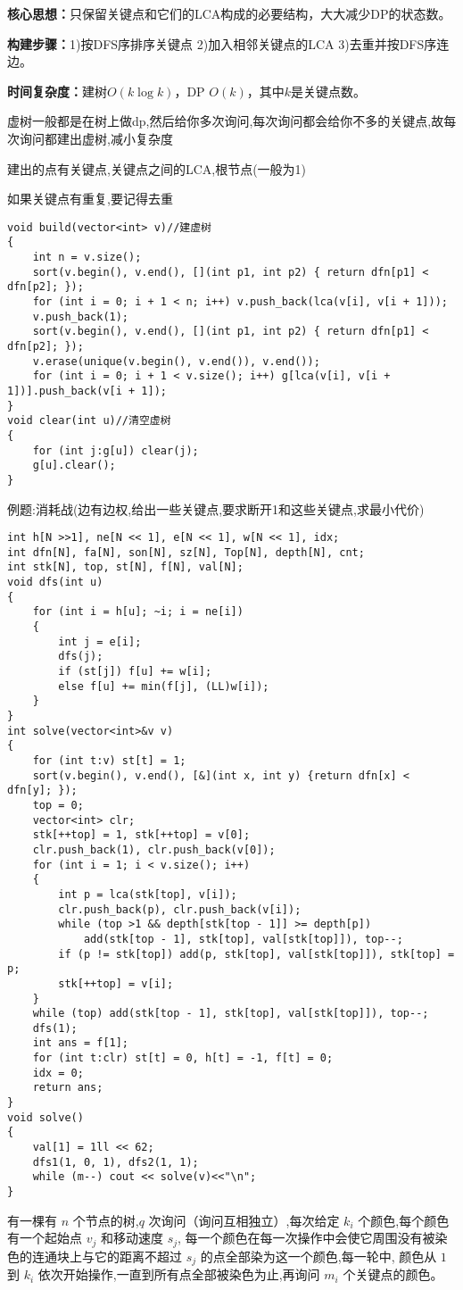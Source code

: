 \documentclass[a4paper, fontset=none]{ctexart}
\begin{document}
\textbf{核心思想：}只保留关键点和它们的LCA构成的必要结构，大大减少DP的状态数。

\textbf{构建步骤：}1)按DFS序排序关键点 2)加入相邻关键点的LCA 3)去重并按DFS序连边。

\textbf{时间复杂度：}建树$O(k\log k)$，DP $O(k)$，其中$k$是关键点数。

虚树一般都是在树上做dp,然后给你多次询问,每次询问都会给你不多的关键点,故每次询问都建出虚树,减小复杂度

建出的点有关键点,关键点之间的LCA,根节点(一般为1)

如果关键点有重复,要记得去重

\begin{verbatim}
void build(vector<int> v)//建虚树
{
    int n = v.size();
    sort(v.begin(), v.end(), [](int p1, int p2) { return dfn[p1] < dfn[p2]; });
    for (int i = 0; i + 1 < n; i++) v.push_back(lca(v[i], v[i + 1]));
    v.push_back(1);
    sort(v.begin(), v.end(), [](int p1, int p2) { return dfn[p1] < dfn[p2]; });
    v.erase(unique(v.begin(), v.end()), v.end());
    for (int i = 0; i + 1 < v.size(); i++) g[lca(v[i], v[i + 1])].push_back(v[i + 1]);
}
void clear(int u)//清空虚树
{
    for (int j:g[u]) clear(j);
    g[u].clear();
}
\end{verbatim}


例题:消耗战(边有边权,给出一些关键点,要求断开1和这些关键点,求最小代价)

\begin{verbatim}
int h[N >>1], ne[N << 1], e[N << 1], w[N << 1], idx;
int dfn[N], fa[N], son[N], sz[N], Top[N], depth[N], cnt;
int stk[N], top, st[N], f[N], val[N];
void dfs(int u)
{
    for (int i = h[u]; ~i; i = ne[i])
    {
        int j = e[i];
        dfs(j);
        if (st[j]) f[u] += w[i];
        else f[u] += min(f[j], (LL)w[i]);
    }
}
int solve(vector<int>&v v)
{
    for (int t:v) st[t] = 1;
    sort(v.begin(), v.end(), [&](int x, int y) {return dfn[x] < dfn[y]; });
    top = 0;
    vector<int> clr;
    stk[++top] = 1, stk[++top] = v[0];
    clr.push_back(1), clr.push_back(v[0]);
    for (int i = 1; i < v.size(); i++)
    {
        int p = lca(stk[top], v[i]);
        clr.push_back(p), clr.push_back(v[i]);
        while (top >1 && depth[stk[top - 1]] >= depth[p])
            add(stk[top - 1], stk[top], val[stk[top]]), top--;
        if (p != stk[top]) add(p, stk[top], val[stk[top]]), stk[top] = p;
        stk[++top] = v[i];
    }
    while (top) add(stk[top - 1], stk[top], val[stk[top]]), top--;
    dfs(1);
    int ans = f[1];
    for (int t:clr) st[t] = 0, h[t] = -1, f[t] = 0;
    idx = 0;
    return ans;
}
void solve()
{
    val[1] = 1ll << 62;
    dfs1(1, 0, 1), dfs2(1, 1);
    while (m--) cout << solve(v)<<"\n";
}
\end{verbatim}
有一棵有 $n$ 个节点的树,$q$ 次询问（询问互相独立）,每次给定 $k_i$ 个颜色,每个颜色有一个起始点 $v_j$ 和移动速度 $s_j$,
每一个颜色在每一次操作中会使它周围没有被染色的连通块上与它的距离不超过 $s_j$ 的点全部染为这一个颜色,每一轮中,
颜色从 $1$ 到 $k_i$ 依次开始操作,一直到所有点全部被染色为止,再询问 $m_i$ 个关键点的颜色。
\end{document}
